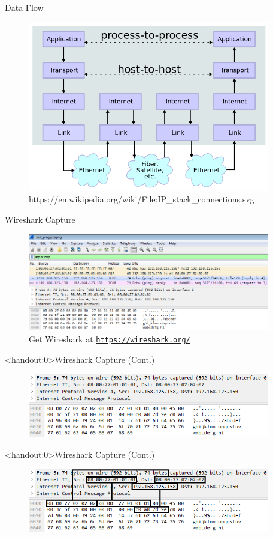 \begin{frame}{Data Flow}
	\begin{figure}
		\includegraphics[width=300pt]{../common/images/IP_stack_connections_flow.png}\\
		{\scriptsize https://en.wikipedia.org/wiki/File:IP\_stack\_connections.svg}
	\end{figure}
\end{frame}
\begin{frame}{Wireshark Capture}
	\begin{figure}
		\includegraphics[width=300pt]{../common/images/Wireshark__ARP_or_ICMP.png} \newline \newline
		Get Wireshark at \texttt{\href{https://wireshark.org/}{https://wireshark.org/}}
	\end{figure}
\end{frame}
\begin{frame}<handout:0>{Wireshark Capture (Cont.)}
	\begin{figure}
		\includegraphics[width=300pt]{../common/images/Wireshark__ARP_or_ICMP_zoom.png}
	\end{figure}
\end{frame}
\begin{frame}<handout:0>{Wireshark Capture (Cont.)}
	\begin{figure}
		\includegraphics[width=300pt]{../common/images/Wireshark__ARP_or_ICMP_zoom_with_lines.png}
	\end{figure}
\end{frame}
